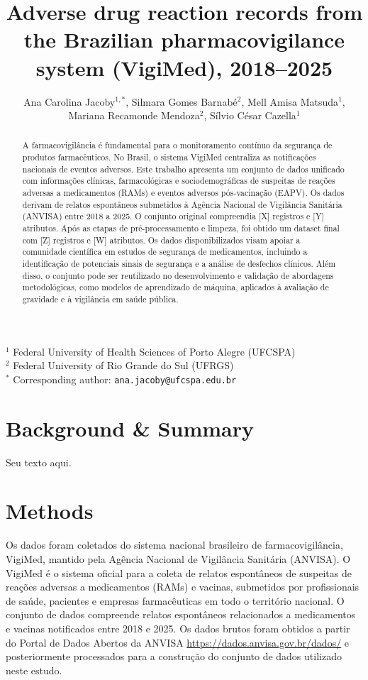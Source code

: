 \documentclass[12pt,a4paper]{article} %
\title{Adverse drug reaction records from the Brazilian pharmacovigilance system (VigiMed), 2018--2025}
\author{
    Ana Carolina Jacoby$^{1, *}$, 
    Silmara Gomes Barnabé$^2$, 
    Mell Amisa Matsuda$^1$, \\
    Mariana Recamonde Mendoza$^2$, 
    Sílvio César Cazella$^1$
}
\date{\vspace{-5ex}} %
\begin{document}
\maketitle

\begin{center}
    \footnotesize
    $^1$ Federal University of Health Sciences of Porto Alegre (UFCSPA) \\
    $^2$ Federal University of Rio Grande do Sul (UFRGS) \\
    $^*$ Corresponding author: \texttt{ana.jacoby@ufcspa.edu.br}
\end{center}

\begin{abstract}

A farmacovigilância é fundamental para o monitoramento contínuo da segurança de produtos farmacêuticos. No Brasil, o sistema VigiMed centraliza as notificações nacionais de eventos adversos. Este trabalho apresenta um conjunto de dados unificado com informações clínicas, farmacológicas e sociodemográficas de suspeitas de reações adversas a medicamentos (RAMs) e eventos adversos pós-vacinação (EAPV). Os dados derivam de relatos espontâneos submetidos à Agência Nacional de Vigilância Sanitária (ANVISA) entre 2018 a 2025. O conjunto original compreendia [X] registros e [Y] atributos. Após as etapas de pré-processamento e limpeza, foi obtido um dataset final com [Z] registros e [W] atributos. Os dados disponibilizados visam apoiar a comunidade científica em estudos de segurança de medicamentos, incluindo a identificação de potenciais sinais de segurança e a análise de desfechos clínicos. Além disso, o conjunto pode ser reutilizado no desenvolvimento e validação de abordagens metodológicas, como modelos de aprendizado de máquina, aplicados à avaliação de gravidade e à vigilância em saúde pública.
\end{abstract}


\section{Background & Summary}
Seu texto aqui.

\section{Methods}

Os dados foram coletados do sistema nacional brasileiro de farmacovigilância, VigiMed, mantido pela Agência Nacional de Vigilância Sanitária (ANVISA). O VigiMed é o sistema oficial para a coleta de relatos espontâneos de suspeitas de reações adversas a medicamentos (RAMs) e vacinas, submetidos por profissionais de saúde, pacientes e empresas farmacêuticas em todo o território nacional.
O conjunto de dados compreende relatos espontâneos relacionados a medicamentos e vacinas notificados entre 2018 e 2025. Os dados brutos foram obtidos a partir do Portal de Dados Abertos da ANVISA \url{https://dados.anvisa.gov.br/dados/} e posteriormente processados para a construção do conjunto de dados utilizado neste estudo.
\end{document}
